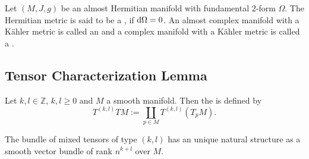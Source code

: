 \begin{definition}
Let $(M,J,g)$ be an almost Hermitian manifold with fundamental $2$-form $\Omega$. The Hermitian metric is said to be a , if $\mathop{}\!\mathrm{d} \Omega = 0$. An almost complex manifold with a K\"ahler metric is called an  and a complex manifold with a K\"ahler metric is called a .
\end{definition}

\begin{appendix}
\section{Tensor Characterization Lemma}
\begin{definition}
Let $k,l \in \mathbb{Z}$, $k,l \geq 0$ and $M$ a smooth manifold. Then the  is defined by
\begin{equation}
T^{(k,l)}TM := \coprod_{p \in M} T^{(k,l)}(T_pM).
\end{equation}
\end{definition}

\begin{proposition}
The bundle of mixed tensors of type $(k,l)$ has an unique natural structure as a smooth vector bundle of rank $n^{k + l}$ over $M$.
\label{prop:smooth_bundle}
\end{proposition}


\end{appendix}
